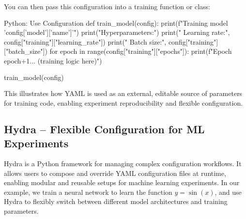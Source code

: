 You can then pass this configuration into a training function or class:

\begin{codeonly}{Python: Use Configuration}
def train_model(config):
    print(f"Training model '{config['model']['name']}'")
    print("Hyperparameters:")
    print("  Learning rate:", config["training"]["learning_rate"])
    print("  Batch size:", config["training"]["batch_size"])
    for epoch in range(config["training"]["epochs"]):
        print(f"Epoch {epoch+1}... (training logic here)")

train_model(config)
\end{codeonly}

This illustrates how YAML is used as an external, editable source of parameters for training code, enabling experiment reproducibility and flexible configuration.

%
\subsection{Hydra – Flexible Configuration for ML Experiments}

Hydra is a Python framework for managing complex configuration workflows. It allows users to compose and override YAML configuration files at runtime, enabling modular and reusable setups for machine learning experiments. In our example, we train a neural network to learn the function \( y = \sin(x) \), and use Hydra to flexibly switch between different model architectures and training parameters.

